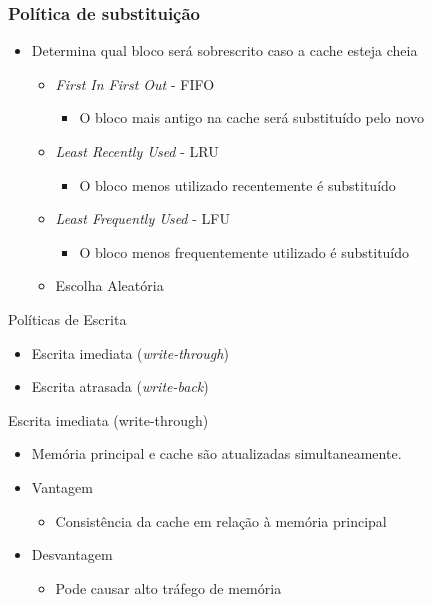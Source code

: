 \documentclass[aspectratio=169,
				xcolor=table]{beamer}
\begin{document}
	\begin{frame}
		\frametitle{Política de substituição}
		\begin{itemize}
			\item Determina qual bloco será sobrescrito caso a cache esteja cheia
			\begin{itemize}
				\item \textit{First In First Out} - FIFO
				\begin{itemize}
					\item O bloco mais antigo na cache será substituído pelo novo
				\end{itemize}
				\item \textit{Least Recently Used} - LRU
				\begin{itemize}
					\item O bloco menos utilizado recentemente é substituído
				\end{itemize}
				\item \textit{Least Frequently Used} - LFU
				\begin{itemize}
					\item O bloco menos frequentemente utilizado é substituído
				\end{itemize}				
				\item Escolha Aleatória
				
			\end{itemize}
		\end{itemize}
	\end{frame}

	\begin{frame}{Políticas de Escrita}
		\begin{itemize}
			\item Escrita imediata (\textit{write-through})
			\item Escrita atrasada (\textit{write-back})
		\end{itemize}
	\end{frame}

	\begin{frame}{Escrita imediata (write-through)}
		\begin{itemize}
			\item Memória principal e cache são atualizadas simultaneamente.
			\vspace{1em}		 
			\item Vantagem
			\begin{itemize}
				\item Consistência da cache em relação à memória principal
			\end{itemize}
			\vspace{1em}
			\item Desvantagem
			\begin{itemize}
				\item Pode causar alto tráfego de memória				
			\end{itemize}		
		
		\end{itemize}
		
	\end{frame}
	
\end{document}
